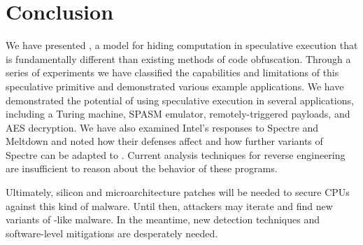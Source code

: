 
\section{Conclusion}

We have presented \speculake, a model for hiding computation in speculative
execution that is fundamentally different than existing methods of code
obfuscation. Through a series of experiments we have classified the capabilities
and limitations of this speculative primitive and demonstrated various example
applications. We have demonstrated the potential of using speculative execution
in several applications, including a Turing machine, SPASM emulator,
remotely-triggered payloads, and AES decryption. We have also examined Intel's
responses to Spectre and Meltdown and noted how their defenses affect \speculake
and how further variants of Spectre can be adapted to \speculake. Current
analysis techniques for reverse engineering are insufficient to reason about the
behavior of these programs.


Ultimately, silicon and microarchitecture patches will be needed to secure CPUs
against this kind of malware. Until then, attackers may
iterate and find new variants of \speculake-like malware.
In the meantime, new detection techniques and
software-level mitigations are desperately needed.

%
